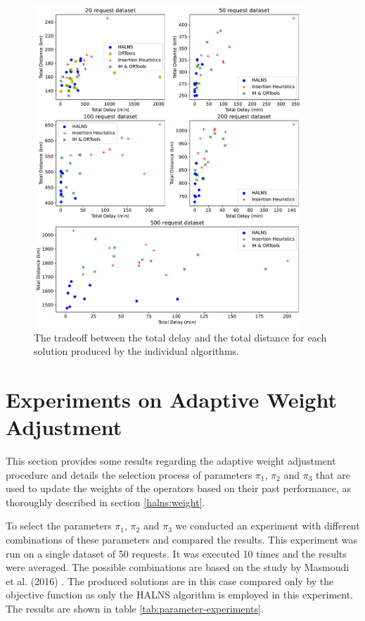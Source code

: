     \begin{figure}[!ht]
        \centering
        \includegraphics[width=0.9\textwidth]{figures/graph-tradeoff-2.pdf}
        \caption{The tradeoff between the total delay and the total distance for each solution produced by the individual algorithms.}
        \label{fig:graph-tradeoff}
    \end{figure}
    

    
    
    \section{Experiments on Adaptive Weight Adjustment}
    
    This section provides some results regarding the adaptive weight adjustment procedure and details the selection process of parameters $\pi_1$, $\pi_2$ and $\pi_3$ that are used to update the weights of the operators based on their past performance, as thoroughly described in section \ref{halns:weight}.
    
    To select the parameters $\pi_1$, $\pi_2$ and $\pi_3$ we conducted an experiment with different combinations of these parameters and compared the results. This experiment was run on a single dataset of 50 requests. It was executed 10 times and the results were averaged. The possible combinations are based on the study by Masmoudi et al. (2016) \cite{Masmoudi2016}. The produced solutions are in this case compared only by the objective function as only the HALNS algorithm is employed in this experiment. The results are shown in table \ref{tab:parameter-experiments}.
    
